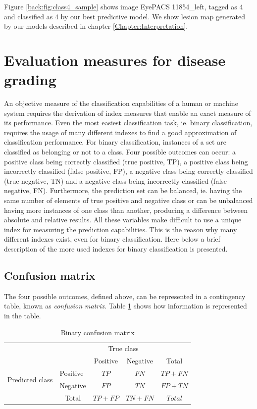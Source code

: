 Figure \ref{back:fig:class4_sample} shows image EyePACS 11854\_left, tagged as 4 and classified as 4 by our best predictive model. We show lesion map generated by our models described in chapter \ref{Chapter:Interpretation}.


\section{Evaluation measures for disease grading}

An objective measure of the classification capabilities of a human or machine system requires the derivation of index measures that enable an exact measure of its performance. Even the most easiest classification task, ie. binary classification, requires the usage of many different indexes to find a good approximation of classification performance. For binary classification, instances of a set are classified as belonging or not to a class. Four possible outcomes can occur: a positive class being correctly classified (true positive, TP), a positive class being incorrectly classified (false positive, FP), a negative class being correctly classified (true negative, TN) and a negative class being incorrectly classified (false negative, FN). Furthermore, the prediction set can be balanced, ie. having the same number of elements of true positive and negative class or can be unbalanced having more instances of one class than another, producing a difference between absolute and relative results. All these variables make difficult to use a unique index for measuring the prediction capabilities. This is the reason why many different indexes exist, even for binary classification. Here below a brief description of the more used indexes for binary classification is presented.

\subsection{Confusion matrix}

The four possible outcomes, defined above, can be represented in a contingency table, known as \emph{confusion matrix}. Table \ref{back:tab:confusion_matrix_example} shows how information is represented in the table. 

\begin{table}[ht]
	\centering
\begin{tabular}{l|l|c|c|c}
	\multicolumn{2}{c}{}&\multicolumn{2}{c}{True class}&\\
	\cline{3-4}
	\multicolumn{2}{c|}{}&Positive&Negative&\multicolumn{1}{c}{Total}\\
	\cline{2-4}
	\multirow{2}{*}{Predicted class}& Positive & $TP$ & $FN$ & $TP+FN$\\
	\cline{2-4}
	& Negative & $FP$ & $TN$ & $FP+TN$\\
	\cline{2-4}
	\multicolumn{1}{c}{} & \multicolumn{1}{c}{Total} & \multicolumn{1}{c}{$TP+FP$} & \multicolumn{    1}{c}{$TN+FN$} & \multicolumn{1}{c}{$Total$}\\
\end{tabular}
	\caption{Binary confusion matrix}
\label{back:tab:confusion_matrix_example} 
\end{table}

